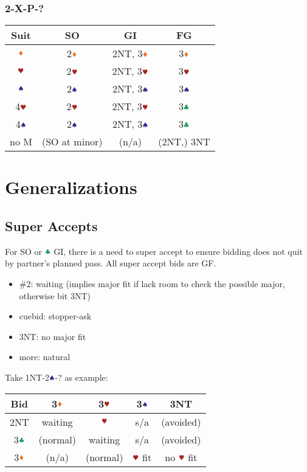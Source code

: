 \documentclass{article}
\begin{document}
\begin{multicols}{2}
\begin{CJK*}{UTF8}{gt}
\subsubsection{2\CCC-X-P-?}
\begin{tabular}{c|c|c|c}
    \hline
    Suit & SO & GI & FG \\ \hline\hline
    $\ddd$ & 2$\ddd$ & 2NT, 3$\ddd$ & 3$\ddd$ \\ \hline
    $\hhh$ & 2$\hhh$ & 2NT, 3$\hhh$ & 3$\hhh$ \\ \hline
    $\sss$ & 2$\sss$ & 2NT, 3$\sss$ & 3$\sss$ \\ \hline
    4$\hhh$ & 2$\hhh$ & 2NT, 3$\hhh$ & 3$\ccc$ \\ \hline
    4$\sss$ & 2$\sss$ & 2NT, 3$\sss$ & 3$\ccc$ \\ \hline
    no M & (SO at minor) & (n/a) & (2NT,) 3NT \\ \hline
\end{tabular}

\section{Generalizations}
\subsection{Super Accepts}
For SO or $\ccc$ GI, there is a need to super accept to ensure bidding does not quit by partner's planned pass. All super accept bids are GF.
\begin{itemize}
    \item \#2: waiting (implies major fit if lack room to check the possible major, otherwise bit 3NT)
    \item cuebid: stopper-ask
    \item 3NT: no major fit
    \item more: natural
\end{itemize}

\noindent Take 1NT-2$\sss$-? as example: \\
\begin{tabular}{c|c|c|c|c}
    \hline
    Bid & 3$\ddd$ & 3$\hhh$ & 3$\sss$ & 3NT \\ \hline\hline
    2NT & waiting & $\hhh$ & s/a & (avoided) \\ \hline
    3$\ccc$ & (normal) & waiting & s/a & (avoided) \\ \hline
    3$\ddd$ & (n/a) & (normal) & $\hhh$ fit & no $\hhh$ fit \\ \hline
\end{tabular}


\end{CJK*}
\end{multicols}
\end{document}
